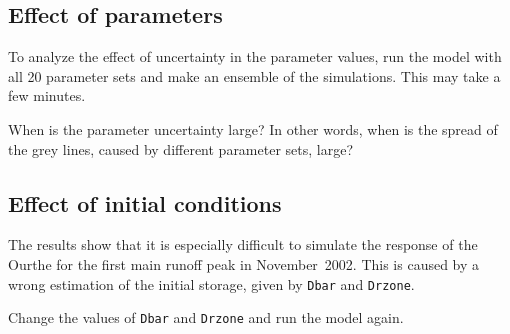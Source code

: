 \documentclass[twocolumn, 10pt, a4paper]{article}
\newenvironment{PC_prac_environment}{
\def\Q{\noindent \color{Gray}\rule[-0.1cm]{\columnwidth}{1.5pt}  \color{black} } \let\ques\Q 
\def\nQ{\noindent \color{black} } \let\ques\nQ 
\def\E{\color{Gray}\rule[0.3cm]{\columnwidth}{1.5pt} \color{black}} \let\ques\E }
\newcommand{\A}[2] { \ifthenelse{\boolean{showanswer}} {\noindent \color{cyan}{#2}\color{black}} {\multido{}{#1}{\noindent \color{light-gray}\hrulefill\\} } }
\begin{document}
\begin{PC_prac_environment}
\subsection{Effect of parameters}
To analyze the effect of uncertainty in the parameter values, run the model with all 20 parameter sets and make an ensemble of the simulations. This may take a few minutes. 

\Q When is the parameter uncertainty large? In other words, when is the spread of the grey lines, caused by different parameter sets, large?\\
\E

\subsection{Effect of initial conditions}
The results show that it is especially difficult to simulate the response of the Ourthe for the first main runoff peak in November~2002. This is caused by a wrong estimation of the initial storage, given by \texttt{Dbar} and \texttt{Drzone}. 

Change the values of \texttt{Dbar} and \texttt{Drzone} and run the model again.


\end{PC_prac_environment}
\end{document}
